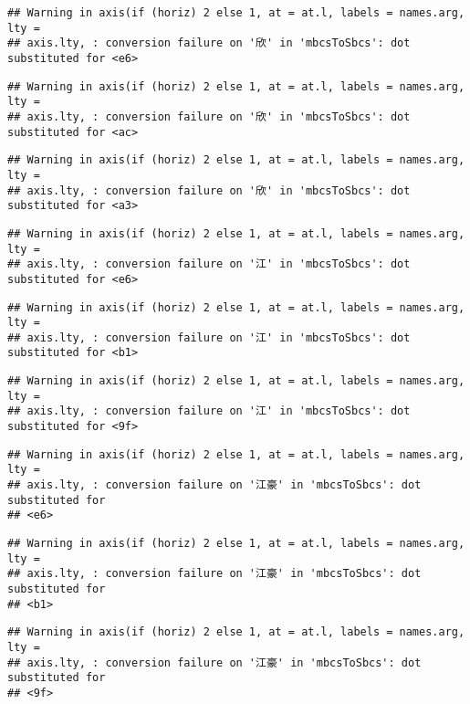 \documentclass[
]{article}
\begin{document}
\begin{verbatim}
## Warning in axis(if (horiz) 2 else 1, at = at.l, labels = names.arg, lty =
## axis.lty, : conversion failure on '欣' in 'mbcsToSbcs': dot substituted for <e6>
\end{verbatim}

\begin{verbatim}
## Warning in axis(if (horiz) 2 else 1, at = at.l, labels = names.arg, lty =
## axis.lty, : conversion failure on '欣' in 'mbcsToSbcs': dot substituted for <ac>
\end{verbatim}

\begin{verbatim}
## Warning in axis(if (horiz) 2 else 1, at = at.l, labels = names.arg, lty =
## axis.lty, : conversion failure on '欣' in 'mbcsToSbcs': dot substituted for <a3>
\end{verbatim}

\begin{verbatim}
## Warning in axis(if (horiz) 2 else 1, at = at.l, labels = names.arg, lty =
## axis.lty, : conversion failure on '江' in 'mbcsToSbcs': dot substituted for <e6>
\end{verbatim}

\begin{verbatim}
## Warning in axis(if (horiz) 2 else 1, at = at.l, labels = names.arg, lty =
## axis.lty, : conversion failure on '江' in 'mbcsToSbcs': dot substituted for <b1>
\end{verbatim}

\begin{verbatim}
## Warning in axis(if (horiz) 2 else 1, at = at.l, labels = names.arg, lty =
## axis.lty, : conversion failure on '江' in 'mbcsToSbcs': dot substituted for <9f>
\end{verbatim}

\begin{verbatim}
## Warning in axis(if (horiz) 2 else 1, at = at.l, labels = names.arg, lty =
## axis.lty, : conversion failure on '江豪' in 'mbcsToSbcs': dot substituted for
## <e6>
\end{verbatim}

\begin{verbatim}
## Warning in axis(if (horiz) 2 else 1, at = at.l, labels = names.arg, lty =
## axis.lty, : conversion failure on '江豪' in 'mbcsToSbcs': dot substituted for
## <b1>
\end{verbatim}

\begin{verbatim}
## Warning in axis(if (horiz) 2 else 1, at = at.l, labels = names.arg, lty =
## axis.lty, : conversion failure on '江豪' in 'mbcsToSbcs': dot substituted for
## <9f>
\end{verbatim}
\end{document}
